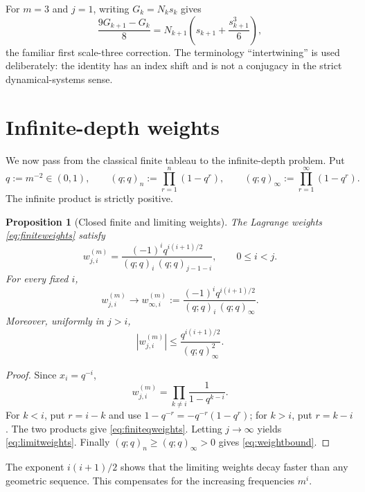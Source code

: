 \documentclass[11pt]{article}
\newtheorem{proposition}[theorem]{Proposition}
\theoremstyle{remark}
\begin{document}
For $m=3$ and $j=1$, writing $G_k=N_ks_k$ gives
\[
\frac{9G_{k+1}-G_k}{8}
=N_{k+1}\left(s_{k+1}+\frac{s_{k+1}^3}{6}\right),
\]
the familiar first scale-three correction.  The terminology
``intertwining'' is used deliberately: the identity has an index shift and is
not a conjugacy in the strict dynamical-systems sense.

\section{Infinite-depth weights}
\label{sec:weights}

We now pass from the classical finite tableau to the infinite-depth problem.
Put
\begin{equation}
q:=m^{-2}\in(0,1),
\qquad
(q;q)_n:=\prod_{r=1}^{n}(1-q^r),
\qquad
(q;q)_\infty:=\prod_{r=1}^{\infty}(1-q^r).
\label{eq:qpoch}
\end{equation}
The infinite product is strictly positive.

\begin{proposition}[Closed finite and limiting weights]
\label{prop:weights}
The Lagrange weights \eqref{eq:finiteweights} satisfy
\begin{equation}
w^{(m)}_{j,i}
=
\frac{(-1)^i q^{i(i+1)/2}}
{(q;q)_i\,(q;q)_{j-1-i}},
\qquad 0\le i<j.
\label{eq:finiteqweights}
\end{equation}
For every fixed $i$,
\begin{equation}
w^{(m)}_{j,i}\longrightarrow
w^{(m)}_{\infty,i}
:=
\frac{(-1)^i q^{i(i+1)/2}}
{(q;q)_i\,(q;q)_\infty}.
\label{eq:limitweights}
\end{equation}
Moreover, uniformly in $j>i$,
\begin{equation}
|w^{(m)}_{j,i}|
\le
\frac{q^{i(i+1)/2}}{(q;q)_\infty^2}.
\label{eq:weightbound}
\end{equation}
\end{proposition}

\begin{proof}
Since $x_i=q^{-i}$,
\[
w^{(m)}_{j,i}
=\prod_{k\ne i}\frac1{1-q^{k-i}}.
\]
For $k<i$, put $r=i-k$ and use
$1-q^{-r}=-q^{-r}(1-q^r)$; for $k>i$, put $r=k-i$.
The two products give \eqref{eq:finiteqweights}.  Letting $j\to\infty$ yields
\eqref{eq:limitweights}.  Finally
$(q;q)_n\ge(q;q)_\infty>0$ gives \eqref{eq:weightbound}.
\end{proof}

The exponent $i(i+1)/2$ shows that the limiting weights decay faster than any
geometric sequence.  This compensates for the increasing frequencies $m^i$.
\end{document}

